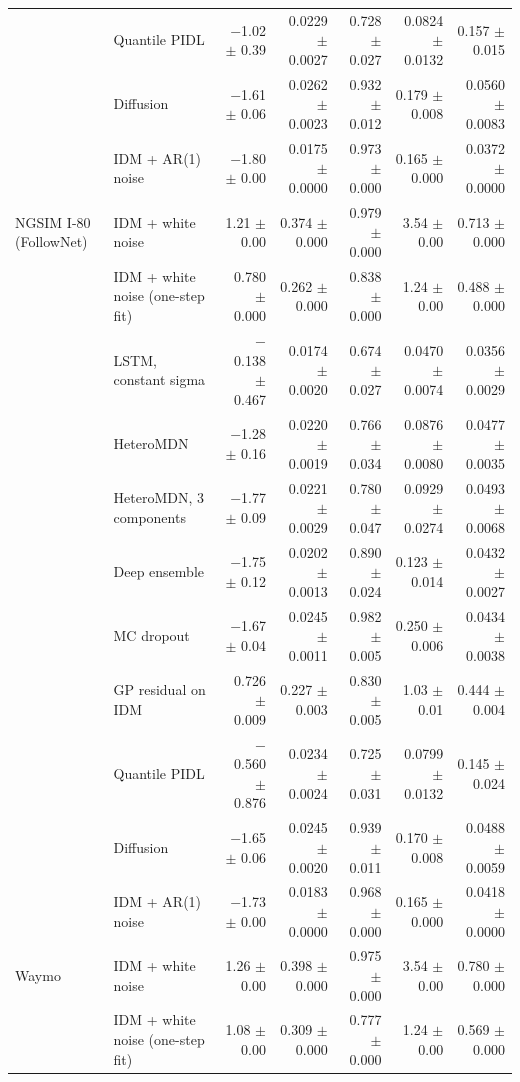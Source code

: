 \begin{longtable}{llrrrrr}
 & Quantile PIDL & $-$1.02 $\pm$ 0.39 & 0.0229 $\pm$ 0.0027 & 0.728 $\pm$ 0.027 & 0.0824 $\pm$ 0.0132 & 0.157 $\pm$ 0.015 \\
 & Diffusion & $-$1.61 $\pm$ 0.06 & 0.0262 $\pm$ 0.0023 & 0.932 $\pm$ 0.012 & 0.179 $\pm$ 0.008 & 0.0560 $\pm$ 0.0083 \\
 & IDM + AR(1) noise & $-$1.80 $\pm$ 0.00 & 0.0175 $\pm$ 0.0000 & 0.973 $\pm$ 0.000 & 0.165 $\pm$ 0.000 & 0.0372 $\pm$ 0.0000 \\
\midrule
NGSIM I-80 (FollowNet) & IDM + white noise & 1.21 $\pm$ 0.00 & 0.374 $\pm$ 0.000 & 0.979 $\pm$ 0.000 & 3.54 $\pm$ 0.00 & 0.713 $\pm$ 0.000 \\
 & IDM + white noise (one-step fit) & 0.780 $\pm$ 0.000 & 0.262 $\pm$ 0.000 & 0.838 $\pm$ 0.000 & 1.24 $\pm$ 0.00 & 0.488 $\pm$ 0.000 \\
 & LSTM, constant sigma & $-$0.138 $\pm$ 0.467 & 0.0174 $\pm$ 0.0020 & 0.674 $\pm$ 0.027 & 0.0470 $\pm$ 0.0074 & 0.0356 $\pm$ 0.0029 \\
 & HeteroMDN & $-$1.28 $\pm$ 0.16 & 0.0220 $\pm$ 0.0019 & 0.766 $\pm$ 0.034 & 0.0876 $\pm$ 0.0080 & 0.0477 $\pm$ 0.0035 \\
 & HeteroMDN, 3 components & $-$1.77 $\pm$ 0.09 & 0.0221 $\pm$ 0.0029 & 0.780 $\pm$ 0.047 & 0.0929 $\pm$ 0.0274 & 0.0493 $\pm$ 0.0068 \\
 & Deep ensemble & $-$1.75 $\pm$ 0.12 & 0.0202 $\pm$ 0.0013 & 0.890 $\pm$ 0.024 & 0.123 $\pm$ 0.014 & 0.0432 $\pm$ 0.0027 \\
 & MC dropout & $-$1.67 $\pm$ 0.04 & 0.0245 $\pm$ 0.0011 & 0.982 $\pm$ 0.005 & 0.250 $\pm$ 0.006 & 0.0434 $\pm$ 0.0038 \\
 & GP residual on IDM & 0.726 $\pm$ 0.009 & 0.227 $\pm$ 0.003 & 0.830 $\pm$ 0.005 & 1.03 $\pm$ 0.01 & 0.444 $\pm$ 0.004 \\
 & Quantile PIDL & $-$0.560 $\pm$ 0.876 & 0.0234 $\pm$ 0.0024 & 0.725 $\pm$ 0.031 & 0.0799 $\pm$ 0.0132 & 0.145 $\pm$ 0.024 \\
 & Diffusion & $-$1.65 $\pm$ 0.06 & 0.0245 $\pm$ 0.0020 & 0.939 $\pm$ 0.011 & 0.170 $\pm$ 0.008 & 0.0488 $\pm$ 0.0059 \\
 & IDM + AR(1) noise & $-$1.73 $\pm$ 0.00 & 0.0183 $\pm$ 0.0000 & 0.968 $\pm$ 0.000 & 0.165 $\pm$ 0.000 & 0.0418 $\pm$ 0.0000 \\
\midrule
Waymo & IDM + white noise & 1.26 $\pm$ 0.00 & 0.398 $\pm$ 0.000 & 0.975 $\pm$ 0.000 & 3.54 $\pm$ 0.00 & 0.780 $\pm$ 0.000 \\
 & IDM + white noise (one-step fit) & 1.08 $\pm$ 0.00 & 0.309 $\pm$ 0.000 & 0.777 $\pm$ 0.000 & 1.24 $\pm$ 0.00 & 0.569 $\pm$ 0.000 \\

\end{longtable}
